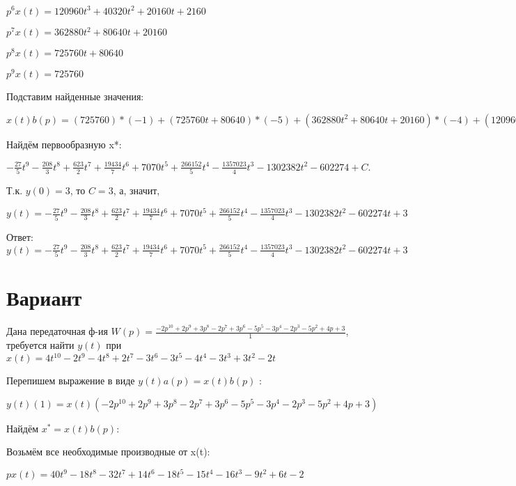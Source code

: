 \documentclass{article}
\begin{document}
{{{{$p^6x(t)=120960t^{3}+40320t^{2}+20160t+2160$

$p^7x(t)=362880t^{2}+80640t+20160$

$p^8x(t)=725760t+80640$

$p^9x(t)=725760$

Подставим найденные значения:

$x(t)b(p) = (725760)*(-1)+(725760t+80640)*(-5)+(362880t^{2}+80640t+20160)*(-4)+(120960t^{3}+40320t^{2}+20160t+2160)*2+(30240t^{4}+13440t^{3}+10080t^{2}+2160t+480)*1+(6048t^{5}+3360t^{4}+3360t^{3}+1080t^{2}+480t+96)*3+(1008t^{6}+672t^{5}+840t^{4}+360t^{3}+240t^{2}+96t-6)*3+(144t^{7}+112t^{6}+168t^{5}+90t^{4}+80t^{3}+48t^{2}-6t+6)*(-4)+(18t^{8}+16t^{7}+28t^{6}+18t^{5}+20t^{4}+16t^{3}-3t^{2}+6t-2)*(-3)=-54t^{8}-624t^{7}+2492t^{6}+19434t^{5}+42420t^{4}+266152t^{3}-1357023t^{2}-3907146t$





Найдём первообразную x*:

$-\frac{27}{5}t^{9}-\frac{208}{3}t^{8}+\frac{623}{2}t^{7}+\frac{19434}{7}t^{6}+7070t^{5}+\frac{266152}{5}t^{4}-\frac{1357023}{4}t^{3}-1302382t^{2}-602274+C.$

Т.к. $y(0)=3$, то $C=3$, а, значит, 

$y(t)=-\frac{27}{5}t^{9}-\frac{208}{3}t^{8}+\frac{623}{2}t^{7}+\frac{19434}{7}t^{6}+7070t^{5}+\frac{266152}{5}t^{4}-\frac{1357023}{4}t^{3}-1302382t^{2}-602274t+3$

Ответ: $y(t) = -\frac{27}{5}t^{9}-\frac{208}{3}t^{8}+\frac{623}{2}t^{7}+\frac{19434}{7}t^{6}+7070t^{5}+\frac{266152}{5}t^{4}-\frac{1357023}{4}t^{3}-1302382t^{2}-602274t+3$

\section{Вариант}

Дана передаточная ф-ия $W(p)=\frac{-2p^{10}+2p^{9}+3p^{8}-2p^{7}+3p^{6}-5p^{5}-3p^{4}-2p^{3}-5p^{2}+4p+3}{1}$, требуется найти $y(t)$ при $x(t)=4t^{10}-2t^{9}-4t^{8}+2t^{7}-3t^{6}-3t^{5}-4t^{4}-3t^{3}+3t^{2}-2t$

Перепишем выражение в виде $y(t)a(p)=x(t)b(p)$ :

$y(t)(1)=x(t)(-2p^{10}+2p^{9}+3p^{8}-2p^{7}+3p^{6}-5p^{5}-3p^{4}-2p^{3}-5p^{2}+4p+3)$

Найдём $x^*=x(t)b(p)$:

Возьмём все необходимые производные от x(t):

$px(t)=40t^{9}-18t^{8}-32t^{7}+14t^{6}-18t^{5}-15t^{4}-16t^{3}-9t^{2}+6t-2$

}}}}
\end{document}
